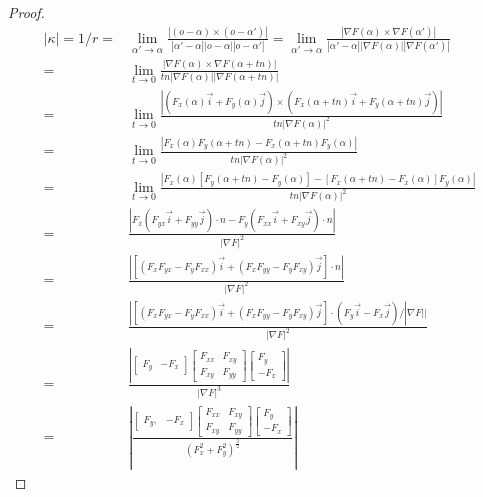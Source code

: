 \documentclass[12pt,a4paper]{article}
\begin{document}
\begin{proof}
\begin{align*}
	|\kappa| = 1/r = &\lim_{\alpha'\rightarrow \alpha}\frac{|(o - \alpha) \times (o - \alpha')|}{|\alpha' - \alpha||o - \alpha||o - \alpha'|} =
	      \lim_{\alpha'\rightarrow \alpha}\frac{|\nabla F(\alpha) \times \nabla F(\alpha')|}{|\alpha' - \alpha||\nabla F(\alpha)||\nabla F(\alpha')|}\\
	      = &\lim_{t\rightarrow 0}\frac{|\nabla F(\alpha) \times \nabla F(\alpha + tn)|}{tn|\nabla F(\alpha)||\nabla F(\alpha + tn)|} \\
	      = &\lim_{t\rightarrow 0}\frac{|(F_x(\alpha)\vec i + F_y(\alpha)\vec j) \times (F_x(\alpha + tn)\vec i + F_y(\alpha + tn)\vec j)|}{tn|\nabla F(\alpha)|^2}\\
	      = &\lim_{t\rightarrow 0}\frac{|F_x(\alpha)F_y(\alpha + tn) - F_x(\alpha + tn)F_y(\alpha)|}{tn|\nabla F(\alpha)|^2}\\
	      = &\lim_{t\rightarrow 0}\frac{|F_x(\alpha)[F_y(\alpha + tn) - F_y(\alpha)] - [F_x(\alpha + tn) - F_x(\alpha)]F_y(\alpha)|}{tn|\nabla F(\alpha)|^2}\\
	      = &\frac{|F_x(F_{yx}\vec i + F_{yy}\vec j)\cdot n - F_y(F_{xx}\vec i + F_{xy}\vec j)\cdot n|}{|\nabla F|^2}\\
	      = &\frac{|[(F_xF_{yx} - F_yF_{xx})\vec i + (F_xF_{yy} - F_yF_{xy})\vec j]\cdot n|}{|\nabla F|^2}\\
	      = &\frac{|[(F_xF_{yx} - F_yF_{xx})\vec i + (F_xF_{yy} - F_yF_{xy})\vec j]\cdot (F_y\vec i - F_x\vec j)/|\nabla F||}{|\nabla F|^2}\\
	      = &
	      \frac{
		      \left|
		      \left[
			      \begin{array}{cc} F_y & -F_x\end{array}
		      \right]
			      \left[
			      \begin{array}{cc} F_{xx} & F_{xy} \\ F_{xy} & F_{yy} \end{array}
		      \right]
			      \left[
			      \begin{array}{c} F_y \\ -F_x\end{array}
		      \right]
		      \right|
	      }
		{
			|\nabla F|^3
		}\\
		= &
		\left|
		\frac{
			\left[
				\begin{array}{cc} F_y, & -F_x\end{array}
			\right]
				\left[
				\begin{array}{cc} F_{xx} & F_{xy} \\ F_{xy} & F_{yy} \end{array}
			\right]
				\left[
				\begin{array}{c} F_y \\ -F_x\end{array}
			\right]
		}{(F_x^2+F_y^2)^\frac32}
		\right|
\end{align*}
\end{proof}
\end{document}
